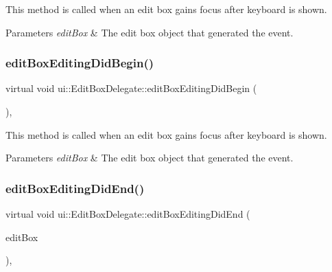 This method is called when an edit box gains focus after keyboard is shown. 
\begin{DoxyParams}{Parameters}
{\em edit\+Box} & The edit box object that generated the event. \\
\hline
\end{DoxyParams}
\mbox{\label{classui_1_1EditBoxDelegate_ad1d1f9d071792d418f48b1ad64527f4d}} 
\subsubsection{\texorpdfstring{edit\+Box\+Editing\+Did\+Begin()}{editBoxEditingDidBegin()}\hspace{0.1cm}{\footnotesize\ttfamily [2/2]}}
{\footnotesize\ttfamily virtual void ui\+::\+Edit\+Box\+Delegate\+::edit\+Box\+Editing\+Did\+Begin (\begin{DoxyParamCaption}\item[{\hyperlink{classui_1_1EditBox}{Edit\+Box} $\ast$}]{ }\end{DoxyParamCaption})\hspace{0.3cm}{\ttfamily [inline]}, {\ttfamily [virtual]}}

This method is called when an edit box gains focus after keyboard is shown. 
\begin{DoxyParams}{Parameters}
{\em edit\+Box} & The edit box object that generated the event. \\
\hline
\end{DoxyParams}
\mbox{\label{classui_1_1EditBoxDelegate_acbd33fc4e40fabb6e7b9ed925b273bbe}} 
\subsubsection{\texorpdfstring{edit\+Box\+Editing\+Did\+End()}{editBoxEditingDidEnd()}\hspace{0.1cm}{\footnotesize\ttfamily [1/2]}}
{\footnotesize\ttfamily virtual void ui\+::\+Edit\+Box\+Delegate\+::edit\+Box\+Editing\+Did\+End (\begin{DoxyParamCaption}\item[{\hyperlink{classui_1_1EditBox}{Edit\+Box} $\ast$}]{edit\+Box }\end{DoxyParamCaption})\hspace{0.3cm}{\ttfamily [inline]}, {\ttfamily [virtual]}}


